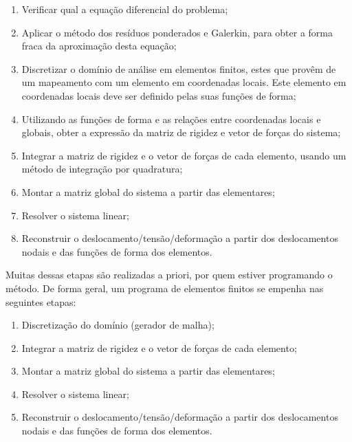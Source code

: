     \begin{enumerate}
        \item Verificar qual a equação diferencial do problema;
        \item Aplicar o método dos resíduos ponderados e Galerkin, para obter a forma fraca da aproximação desta equação;
        \item Discretizar o domínio de análise em elementos finitos, estes que provêm de um mapeamento com um elemento em coordenadas locais. Este elemento em coordenadas locais deve ser definido pelas suas funções de forma;
        \item Utilizando as funções de forma e as relações entre coordenadas locais e globais, obter a expressão da matriz de rigidez e vetor de forças do sistema;
        \item Integrar a matriz de rigidez e o vetor de forças de cada elemento, usando um método de integração por quadratura;
        \item Montar a matriz global do sistema a partir das elementares;
        \item Resolver o sistema linear;
        \item Reconstruir o deslocamento/tensão/deformação a partir dos deslocamentos nodais e das funções de forma dos elementos.
    \end{enumerate}

    Muitas dessas etapas são realizadas a priori, por quem estiver programando o método. De forma geral, um programa de elementos finitos se empenha nas seguintes etapas:

    \begin{enumerate}
        \item Discretização do domínio (gerador de malha);
        \item Integrar a matriz de rigidez e o vetor de forças de cada elemento;
        \item Montar a matriz global do sistema a partir das elementares;
        \item Resolver o sistema linear;
        \item Reconstruir o deslocamento/tensão/deformação a partir dos deslocamentos nodais e das funções de forma dos elementos.
    \end{enumerate}
